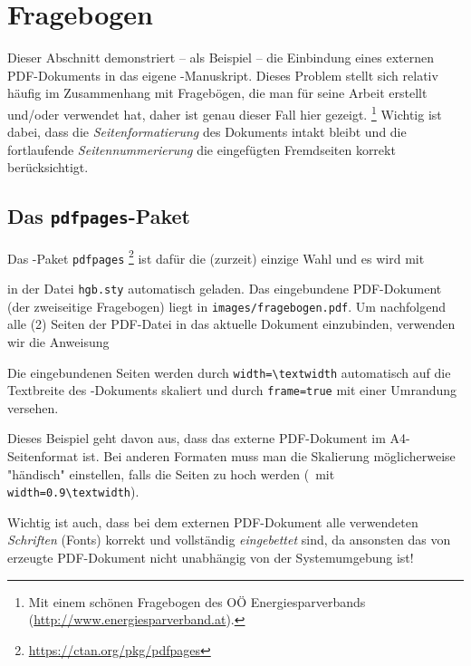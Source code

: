 \chapter{Fragebogen}
\label{app:Fragebogen}


Dieser Abschnitt demonstriert -- als Beispiel -- die Einbindung eines externen PDF-Dokuments
in das eigene \latex-Manuskript.
Dieses Problem stellt sich relativ häufig im Zusammenhang mit Fragebögen, die
man für seine Arbeit erstellt und/oder verwendet hat, daher ist genau dieser Fall hier gezeigt.%
\footnote{Mit einem schönen Fragebogen des OÖ Energiesparverbands (\url{http://www.energiesparverband.at}).}
Wichtig ist dabei, dass die \emph{Seitenformatierung} des Dokuments intakt bleibt 
und die fortlaufende \emph{Seitennummerierung} die eingefügten Fremdseiten korrekt berücksichtigt.

\section{Das \texttt{pdfpages}-Paket}

Das \latex-Paket \texttt{pdfpages}%
\footnote{\url{https://ctan.org/pkg/pdfpages}}
ist dafür die (zurzeit) einzige Wahl und es wird mit 
%
\begin{LaTeXCode}[numbers=none]
\RequirePackage{pdfpages}
\end{LaTeXCode}
%
in der Datei \nolinkurl{hgb.sty} automatisch geladen.
Das eingebundene PDF-Dokument (der zweiseitige Frage\-bogen) liegt in
\nolinkurl{images/fragebogen.pdf}.
Um nachfolgend alle (2) Seiten der PDF-Datei in das aktuelle Dokument einzubinden,
verwenden wir die Anweisung  
%
\begin{LaTeXCode}[numbers=none]

\end{LaTeXCode}
%
Die eingebundenen Seiten werden durch \verb!width=\textwidth! automatisch auf die Textbreite
des \latex-Dokuments skaliert und durch \verb!frame=true! mit einer Umrandung versehen.

Dieses Beispiel geht davon aus, dass das externe PDF-Dokument im A4-Seitenformat ist.
Bei anderen Formaten muss man die Skalierung möglicherweise "händisch" einstellen,
falls die Seiten zu hoch werden (\zB\ mit \verb!width=0.9\textwidth!).

Wichtig ist auch, dass bei dem externen PDF-Dokument alle verwendeten \emph{Schriften}
(Fonts) korrekt und vollständig \emph{eingebettet} sind, da ansonsten das von \latex erzeugte 
PDF-Dokument nicht unabhängig von der Systemumgebung ist!


